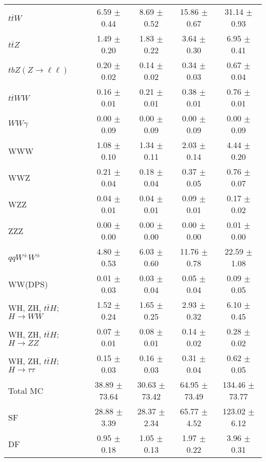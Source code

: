 \begin{tabular}{l|cccc}
                   $t\overline{t}W$ &  6.59 $\pm$  0.44 &  8.69 $\pm$  0.52 & 15.86 $\pm$  0.67 & 31.14 $\pm$  0.93 \\
                   $t\overline{t}Z$ &  1.49 $\pm$  0.20 &  1.83 $\pm$  0.22 &  3.64 $\pm$  0.30 &  6.95 $\pm$  0.41 \\
    $tbZ (Z \rightarrow \ell \ell)$ &  0.20 $\pm$  0.02 &  0.14 $\pm$  0.02 &  0.34 $\pm$  0.03 &  0.67 $\pm$  0.04 \\
                  $t\overline{t}WW$ &  0.16 $\pm$  0.01 &  0.21 $\pm$  0.01 &  0.38 $\pm$  0.01 &  0.76 $\pm$  0.01 \\
                         $WW\gamma$ &  0.00 $\pm$  0.09 &  0.00 $\pm$  0.09 &  0.00 $\pm$  0.09 &  0.00 $\pm$  0.09 \\
                                WWW &  1.08 $\pm$  0.10 &  1.34 $\pm$  0.11 &  2.03 $\pm$  0.14 &  4.44 $\pm$  0.20 \\
                                WWZ &  0.21 $\pm$  0.04 &  0.18 $\pm$  0.04 &  0.37 $\pm$  0.05 &  0.76 $\pm$  0.07 \\
                                WZZ &  0.04 $\pm$  0.01 &  0.04 $\pm$  0.01 &  0.09 $\pm$  0.01 &  0.17 $\pm$  0.02 \\
                                ZZZ &  0.00 $\pm$  0.00 &  0.00 $\pm$  0.00 &  0.00 $\pm$  0.00 &  0.01 $\pm$  0.00 \\
                 $qqW^{\pm}W^{\pm}$ &  4.80 $\pm$  0.53 &  6.03 $\pm$  0.60 & 11.76 $\pm$  0.78 & 22.59 $\pm$  1.08 \\
                            WW(DPS) &  0.01 $\pm$  0.03 &  0.03 $\pm$  0.04 &  0.05 $\pm$  0.04 &  0.09 $\pm$  0.05 \\
WH, ZH, $t\bar{t}H$; $H \rightarrow WW$ &  1.52 $\pm$  0.24 &  1.65 $\pm$  0.25 &  2.93 $\pm$  0.32 &  6.10 $\pm$  0.45 \\
WH, ZH, $t\bar{t}H$; $H \rightarrow ZZ$ &  0.07 $\pm$  0.01 &  0.08 $\pm$  0.01 &  0.14 $\pm$  0.02 &  0.28 $\pm$  0.02 \\
WH, ZH, $t\bar{t}H$; $H \rightarrow \tau\tau$ &  0.15 $\pm$  0.03 &  0.16 $\pm$  0.03 &  0.31 $\pm$  0.04 &  0.62 $\pm$  0.05 \\
\hline\hline
                           Total MC & 38.89 $\pm$ 73.64 & 30.63 $\pm$ 73.42 & 64.95 $\pm$ 73.49 & 134.46 $\pm$ 73.77 \\
\hline
                                 SF & 28.88 $\pm$  3.39 & 28.37 $\pm$  2.34 & 65.77 $\pm$  4.52 & 123.02 $\pm$  6.12 \\
                                 DF &  0.95 $\pm$  0.18 &  1.05 $\pm$  0.13 &  1.97 $\pm$  0.22 &  3.96 $\pm$  0.31 \\

\end{tabular}
